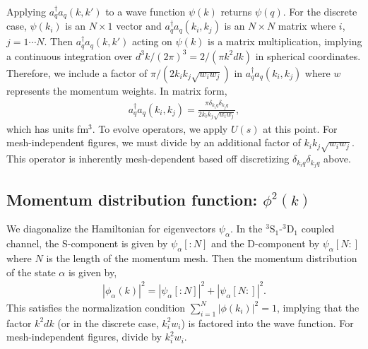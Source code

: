 \documentclass[preprintnumbers,floatfix,aps,prc,preprint,nofootinbib]{revtex4-1}
\begin{document}
Applying $a^{\dagger}_q a_q (k, k')$ to a wave function $\psi(k)$ returns $\psi(q)$. For the discrete case, $\psi(k_i)$ is an $N \times 1$ vector and $a^{\dagger}_q a_q (k_i, k_j)$ is an $N \times N$ matrix where $i$, $j=1\cdots N$. Then $a^{\dagger}_q a_q (k, k')$ acting on $\psi(k)$ is a matrix multiplication, implying a continuous integration over $d^3k / (2 \pi)^3 = 2 / (\pi k^2 dk)$ in spherical coordinates. Therefore, we include a factor of $\pi / (2 k_i k_j \sqrt{w_i w_j})$ in $a^{\dagger}_q a_q (k_i, k_j)$ where $w$ represents the momentum weights. In matrix form,
%
\begin{eqnarray}
	\label{eq:momentum_projection_operator}
	a^{\dagger}_q a_q (k_i, k_j) = \frac{\pi \delta_{k_i q} \delta_{k_j q}}{2 k_i k_j \sqrt{w_i w_j}},
\end{eqnarray}
%
which has units fm$^3$. To evolve operators, we apply $U(s)$ at this point. For mesh-independent figures, we must divide by an additional factor of $k_i k_j \sqrt{w_i w_j}$. This operator is inherently mesh-dependent based off discretizing $\delta_{k_i q} \delta_{k_j q}$ above.


\subsection{Momentum distribution function: $\phi^2(k)$}
\label{sec:momentum_dist_funcs}


We diagonalize the Hamiltonian for eigenvectors $\psi_{\alpha}$. In the $^3$S$_1$-$^3$D$_1$ coupled channel, the S-component is given by $\psi_{\alpha}[: \! N]$ and the D-component by $\psi_{\alpha}[N \! :]$ where $N$ is the length of the momentum mesh. Then the momentum distribution of the state $\alpha$ is given by,
%
\begin{eqnarray}
	\label{eq:momentum_distribution}
	|\phi_{\alpha}(k)|^2 = |\psi_{\alpha}[: \! N]|^2 + |\psi_{\alpha}[N \! :]|^2.
\end{eqnarray}
%
This satisfies the normalization condition $\sum_{i=1}^N |\phi(k_i)|^2 = 1$, implying that the factor $k^2 dk$ (or in the discrete case, $k_i^2 w_i$) is factored into the wave function. For mesh-independent figures, divide by $k_i^2 w_i$.
\end{document}
